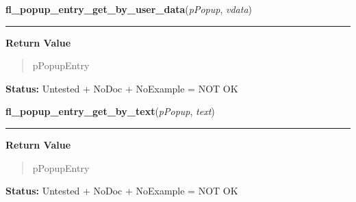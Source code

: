     \label{xformslib:library:fl_popup_entry_get_by_user_data}

    \vspace{0.5ex}

\hspace{.8\funcindent}\begin{boxedminipage}{\funcwidth}

    \raggedright \textbf{fl\_popup\_entry\_get\_by\_user\_data}(\textit{pPopup}, \textit{vdata})

    \vspace{-1.5ex}

    \rule{\textwidth}{0.5\fboxrule}
\setlength{\parskip}{2ex}
\setlength{\parskip}{1ex}
      \textbf{Return Value}
    \vspace{-1ex}

      \begin{quote}
      pPopupEntry

      \end{quote}

\textbf{Status:} Untested + NoDoc + NoExample = NOT OK



    \end{boxedminipage}

    \label{xformslib:library:fl_popup_entry_get_by_text}

    \vspace{0.5ex}

\hspace{.8\funcindent}\begin{boxedminipage}{\funcwidth}

    \raggedright \textbf{fl\_popup\_entry\_get\_by\_text}(\textit{pPopup}, \textit{text})

    \vspace{-1.5ex}

    \rule{\textwidth}{0.5\fboxrule}
\setlength{\parskip}{2ex}
\setlength{\parskip}{1ex}
      \textbf{Return Value}
    \vspace{-1ex}

      \begin{quote}
      pPopupEntry

      \end{quote}

\textbf{Status:} Untested + NoDoc + NoExample = NOT OK



    \end{boxedminipage}

